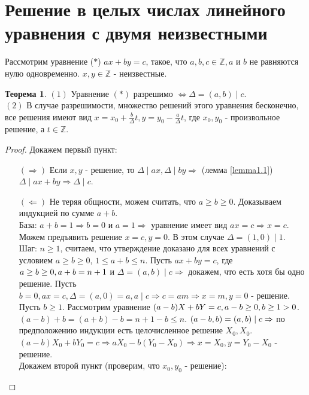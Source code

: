\documentclass[a4paper, 12pt]{article}
\newcommand{\Z}{\mathbb{Z}}
\newcommand{\lra}{\Leftrightarrow}
\renewcommand{\div}{\mid}
\theoremstyle{definition}
\newtheorem{theorem}{Теорема}[section]
\begin{document}
    \section{Решение в целых числах линейного уравнения с двумя неизвестными}
    Рассмотрим уравнение ($*$) $ax+by=c$, такое, что $a,b,c\in \Z, a$ и $b$ не равняются нулю одновременно. $x,y\in \Z$ - неизвестные.
    \begin{theorem} \label{th4.1}
        $(1)$ Уравнение $(*)$ разрешимо $\lra \Delta = (a,b) \div c$.\\
        $(2)$ В случае разрешимости, множество решений этого уравнения бесконечно, все решения имеют вид $x=x_0+\frac{b}{\Delta}t, y=y_0-\frac{a}{\Delta}t$, где $x_0,y_0$ - произвольное решение, а $t\in \Z$.
    \end{theorem} 
    \begin{proof}
        Докажем первый пункт:
        \begin{itemize}
            \item[$(\Rightarrow)$] Если $x,y$ - решение, то $\Delta \div ax, \Delta \div by\Rightarrow$ (лемма \ref{lemma1.1}) $\Delta \div ax+by\Rightarrow \Delta \div c$.
            \item[$(\Leftarrow)$] Не теряя общности, можем считать, что $a\geq b\geq 0$. Доказываем индукцией по сумме $a+b$. \\
            База: $a+b=1\Rightarrow b=0$ и $a=1 \Rightarrow$ уравнение имеет вид $ax=c\Rightarrow x=c$. Можем предъявить решение $x=c, y=0$. В этом случае $\Delta = (1,0) \div 1$. \\
            Шаг: $n\geq 1$, считаем, что утверждение доказано для всех уравнений с условием $a\geq b\geq 0$, $1\leq a+b\leq n$. Пусть $ax+by=c$, где $a\geq b\geq 0,\\ a+b=n+1$ и $\Delta = (a,b) \div c \Rightarrow$ докажем, что есть хотя бы одно решение. Пусть $b=0, ax=c, \Delta = (a,0)=a, a\div c\Rightarrow c=am\Rightarrow x=m, y=0$ - решение. Пусть $b\geq 1$. Рассмотрим уравнение $(a-b)X+bY=c,\\ a-b\geq 0, b\geq 1 >0$. $(a-b)+b=(a+b)-b=n+1-b\leq n$. $(a-b, b)=(a,b) \div c\\ \Rightarrow$ по предположению индукции есть целочисленное решение $X_0,X_0$. \\ $(a-b)X_0+bY_0=c\Rightarrow aX_0-b(Y_0-X_0)\Rightarrow x=X_0, y=Y_0-X_0$ - решение.\\
            Докажем второй пункт (проверим, что $x_0,y_0$ - решение):\\

\end{itemize}
\end{proof}
\end{document}
